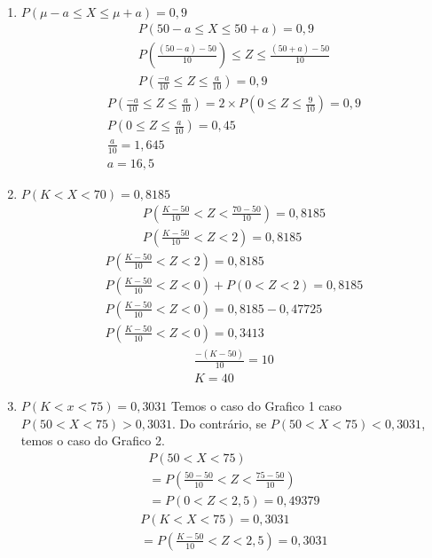 \documentclass[11pt,a4paper]{book}
\begin{document}
\begin{description}
\begin{description}
\begin{description}
\begin{enumerate}[label=(\alph*)]
  \item $P( \mu-a \leq X \leq \mu +a )=0,9$
\begin{align*}
  P(50- a \leq X \leq 50 +a)  = 0,9 \\
  P(\frac{(50-a)-50}{10}) \leq Z \leq \frac{(50+a)-50}{10} \\
  P(\frac{-a}{10} \leq Z \leq \frac{a}{10})=0,9 
\end{align*}
\begin{align*}
  P( \frac{-a}{10} \leq Z \leq \frac{a}{10} ) = 2 \times P(0 \leq Z \leq \frac{9}{10})= 0,9 \\
  P(0 \leq Z \leq \frac{a}{10})=0,45 \\
  \frac{a}{10}= 1,645 \\
  a = 16,5
\end{align*}
  \item $P(K< X <70)=0,8185$
    \begin{align*}
      P( \frac{K-50}{10} < Z < \frac{70-50}{10} ) = 0,8185 \\
      P(\frac{K-50}{10} < Z < 2) =0,8185
    \end{align*}
    \begin{align*}
      P( \frac{K-50}{10}<Z<2 )  = 0,8185 \\
      P( \frac{K-50}{10} < Z <0) + P(0 < Z <2) =0,8185 \\
      P(\frac{K-50}{10}<Z < 0) = 0,8185 - 0,47725 \\
      P( \frac{K-50}{10} < Z < 0 ) =0,3413
    \end{align*}
    \begin{align*}
      \frac{-(K-50)}{10} = 10 \\
      K= 40
    \end{align*}
  \item $P(K < x <75)= 0,3031$
    Temos o caso do Grafico 1 caso $P(50 < X < 75) > 0,3031$. Do contrário, se 
    $P(50 < X < 75) < 0,3031$, temos o caso do Grafico 2.
    \begin{align*}
      P(50 < X < 75)  \\
      =P(\frac{50-50}{10} < Z < \frac{75-50}{10}) \\
      =P(0 < Z < 2,5) = 0,49379
    \end{align*}
    \begin{align*}
      P(K < X < 75)  = 0,3031\\
      =P(\frac{K-50}{10}< Z <2,5)= 0,3031
    \end{align*}

\end{enumerate}
\end{description}
\end{description}
\end{description}
\end{document}
